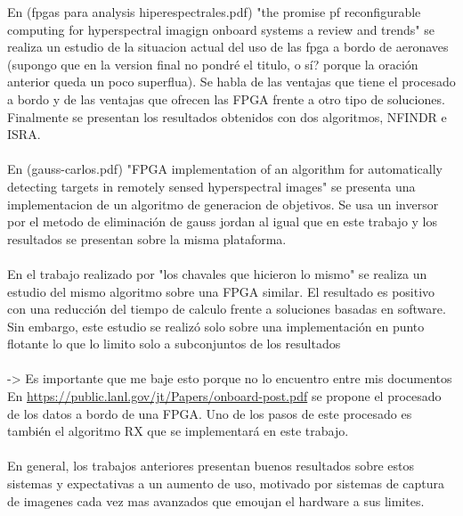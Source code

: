 En (fpgas para analysis hiperespectrales.pdf) "the promise pf reconfigurable computing for hyperspectral imagign onboard systems a review and trends" se realiza un estudio de la situacion actual del uso de las fpga a bordo de aeronaves (supongo que en la version final no pondré el titulo, o sí? porque la oración anterior queda un poco superflua). Se habla de las ventajas que tiene el procesado a bordo y de las ventajas que ofrecen las FPGA frente a otro tipo de soluciones. Finalmente se presentan los resultados obtenidos con dos algoritmos, NFINDR e ISRA.
\\
\\
En (gauss-carlos.pdf) "FPGA implementation of an algorithm for automatically detecting targets in remotely sensed hyperspectral images" se presenta una implementacion de un algoritmo de generacion de objetivos. Se usa un inversor por el metodo de eliminación de gauss jordan al igual que en este trabajo y los resultados se presentan sobre la misma plataforma.
\\
\\
En el trabajo realizado por "los chavales que hicieron lo mismo" se realiza un estudio del mismo algoritmo sobre una FPGA similar. El resultado es positivo con una reducción del tiempo de calculo frente a soluciones basadas en software. Sin embargo, este estudio se realizó solo sobre una implementación en punto flotante lo que lo limito solo a subconjuntos de los resultados
\\
\\
-> Es importante que me baje esto porque no lo encuentro entre mis documentos
En \url{https://public.lanl.gov/jt/Papers/onboard-post.pdf} se propone el procesado de los datos a bordo de una FPGA. Uno de los pasos de este procesado es también el algoritmo RX que se implementará en este trabajo.
\\
\\
En general, los trabajos anteriores presentan buenos resultados sobre estos sistemas y expectativas a un aumento de uso, motivado por sistemas de captura de imagenes cada vez mas avanzados que emoujan el hardware a sus limites.



